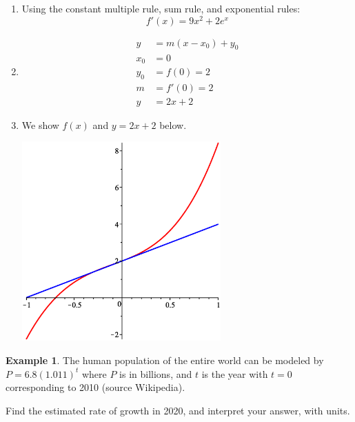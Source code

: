\documentclass[oneside]{book}
\theoremstyle{definition}
\newtheorem{example}{Example}
\theoremstyle{solution}
\newtheorem*{solution}{Solution}
\newenvironment{solution}{\vspace{2in}\comment}{\endcomment}
\begin{document}
\begin{solution} 
\begin{enumerate}
\item Using the constant multiple rule, sum rule, and exponential
  rules:
    $$ 
    f'(x) = 9x^2 + 2e^x 
    $$

\item 
\begin{align*}
 y & = m(x-x_0) + y_0\\
 x_0 & = 0\\
 y_0 & = f(0) = 2\\
 m & = f'(0) = 2\\
y & = 2x+2
\end{align*}

\item We show $f(x)$ and $y=2x+2$ below.  
\begin{center}
\includegraphics[width=3in]{exponential_with_tangent_line}
\end{center}
\end{enumerate}
\end{solution}



\begin{example}
  The human population of the entire world can be modeled by
  $P = 6.8(1.011)^t$ where $P$ is in billions, and $t$ is the year
  with $t = 0$ corresponding to 2010 (source Wikipedia).
\bigskip



  Find the estimated rate of growth in 2020, and interpret your answer,
  with units.
\end{example}
\end{document}
